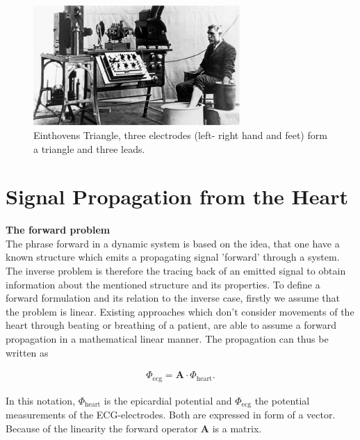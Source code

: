 \begin{figure}[ht]
    \center
    \includegraphics[width=0.7\textwidth]{figures/einthovens_triangle.png}
	\caption{Einthovens Triangle, three electrodes (left- right hand and feet) form a triangle and three leads.}
	\label{fig:einthoven_triangle}
\end{figure}


\section{Signal Propagation from the Heart}
\textbf{The forward problem}\\
The phrase forward in a dynamic system is based on the idea, that one have a known structure which emits a propagating signal 'forward' through a system. The inverse problem is therefore the tracing back of an emitted signal to obtain information about the mentioned structure and its properties.
To define a forward formulation and its relation to the inverse case, firstly we assume that the problem is linear. Existing approaches which don't consider movements of the heart through beating or breathing of a patient, are able to assume a forward propagation in a mathematical linear manner\cite[p. 241f]{sundnes_computing_2006}. The propagation can thus be written as 

\begin{align}
    \label{eq:linearity}
    \varPhi_{\text{ecg}} =\textbf{A}\cdot\varPhi_{\text{heart}}.
\end{align}

In this notation, $\varPhi_{\text{heart}}$ is the epicardial potential and $\varPhi_{\text{ecg}}$ the potential measurements of the ECG-electrodes. Both are expressed in form of a vector. Because of the linearity the forward operator $\textbf{A}$ is a matrix.\\

